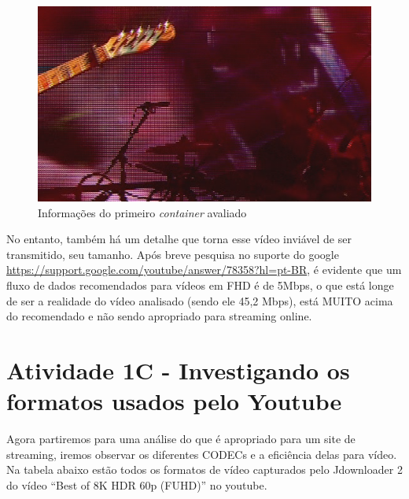 \begin{figure}[H]
    \centering
    \caption{Informações do primeiro \textit{container} avaliado}
    \label{fig:imagem7}
    \includegraphics[scale=0.5]{Documeto/1-ElementosTextuais/images/07.png}
    
    \autoriaPropria
\end{figure}

\paragrafo No entanto, também há um detalhe que torna esse vídeo inviável de ser transmitido, seu tamanho. Após breve pesquisa no suporte do google \url{https://support.google.com/youtube/answer/78358?hl=pt-BR}, é evidente que um fluxo de dados recomendados para vídeos em FHD é de 5Mbps, o que está longe de ser a realidade do vídeo analisado (sendo ele 45,2 Mbps), está MUITO acima do recomendado e não sendo apropriado para streaming online.


\section{Atividade 1C - Investigando os formatos usados pelo Youtube}
Agora partiremos para uma análise do que é apropriado para um site de streaming, iremos observar os diferentes CODECs e a eficiência delas para vídeo.
Na tabela abaixo estão todos os formatos de vídeo capturados pelo Jdownloader 2 do vídeo “Best of 8K HDR 60p (FUHD)” no youtube.

